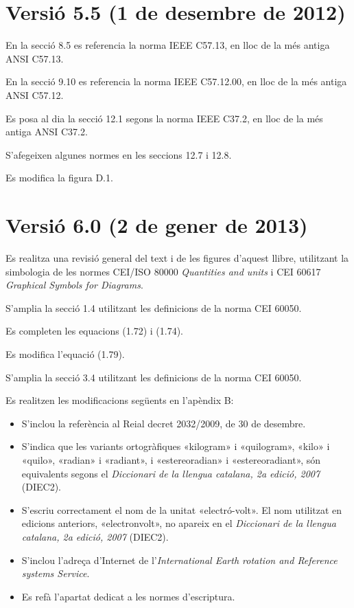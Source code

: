 \section*{Versió 5.5 (1 de desembre de 2012)}

En la secció 8.5 es referencia la norma  IEEE C57.13, en lloc de la més antiga ANSI C57.13.

En la secció 9.10 es referencia la norma  IEEE C57.12.00, en lloc de la més antiga ANSI C57.12.

Es posa al dia la secció 12.1 segons la norma IEEE C37.2, en lloc de la més antiga ANSI C37.2.

S'afegeixen algunes normes en les seccions 12.7 i 12.8.

Es modifica  la figura D.1.


\section*{Versió 6.0 (2 de gener de 2013)}

Es realitza una revisió general del text i de les figures d'aquest  llibre, utilitzant la simbologia de les normes CEI/ISO 80000  \textit{Quantities and units} i  CEI 60617  \textit{Graphical Symbols for Diagrams}.

S'amplia la secció 1.4 utilitzant les definicions de la norma CEI 60050.

Es completen les equacions (1.72) i (1.74).

Es modifica l'equació (1.79).

S'amplia la secció  3.4 utilitzant les definicions de la norma CEI 60050.

Es realitzen les modificacions següents en l'apèndix B:
\begin{itemize}
   \item  S'inclou la referència al Reial decret 2032/2009, de 30 de desembre.
   \item S'indica que les variants ortogràfiques  «kilogram»
    i «quilogram», «kilo» i «quilo», «radian» i «radiant», i
   «estereoradian» i «estereoradiant», són equivalents segons el   \textit{Diccionari de la llengua catalana, 2a edició, 2007} (DIEC2).
    \item S'escriu correctament el nom de la unitat «electró-volt». El nom  utilitzat en edicions anteriors,   «electronvolt», no apareix en el \textit{Diccionari de la llengua catalana, 2a edició, 2007} (DIEC2).
    \item S'inclou l'adreça d'Internet de l'\textit{International Earth rotation and Reference systems Service}.
     \item Es refà l'apartat dedicat a les normes d'escriptura.
\end{itemize}

